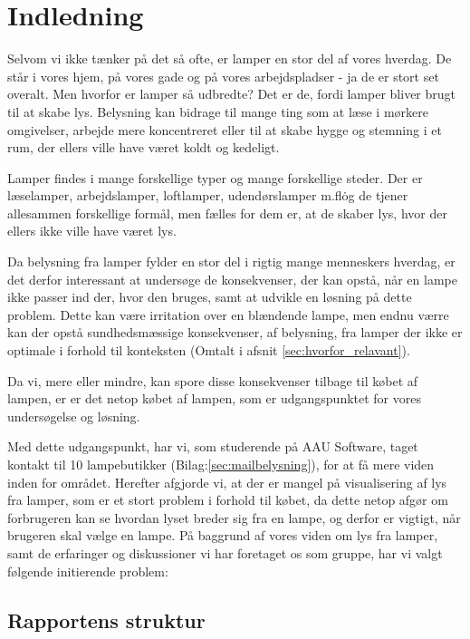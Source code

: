 \section{Indledning}
Selvom vi ikke tænker på det så ofte, er lamper en stor del af vores hverdag. De står i vores hjem, på vores gade og på vores arbejdspladser - ja de er stort set overalt. Men hvorfor er lamper så udbredte? Det er de, fordi lamper bliver brugt til at skabe lys. Belysning kan bidrage til mange ting som at læse i mørkere omgivelser, arbejde mere koncentreret eller til at skabe hygge og stemning i et rum, der ellers ville have været koldt og kedeligt. 

Lamper findes i mange forskellige typer og mange forskellige steder. Der er læselamper, arbejdslamper, loftlamper, udendørslamper m.fl\. og de tjener allesammen forskellige formål, men fælles for dem er, at de skaber lys, hvor der ellers ikke ville have været lys. 

Da belysning fra lamper fylder en stor del i rigtig mange menneskers hverdag, er det derfor interessant at undersøge de konsekvenser, der kan opstå, når en lampe ikke passer ind der, hvor den bruges, samt at udvikle en løsning på dette problem. Dette kan være irritation over en blændende lampe, men endnu værre kan der opstå sundhedsmæssige konsekvenser, af belysning, fra lamper der ikke er optimale i forhold til konteksten (Omtalt i afsnit \ref{sec:hvorfor_relavant}).

Da vi, mere eller mindre, kan spore disse konsekvenser tilbage til købet af lampen, er er det netop købet af lampen, som er udgangspunktet for vores undersøgelse og løsning.

Med dette udgangspunkt, har vi, som studerende på AAU Software, taget kontakt til 10 lampebutikker (Bilag:\ref{sec:mailbelysning}), for at få mere viden inden for området. Herefter afgjorde vi, at der er mangel på visualisering af lys fra lamper, som er et stort problem i forhold til købet, da dette netop afgør om forbrugeren kan se hvordan lyset breder sig fra en lampe, og derfor er vigtigt, når brugeren skal vælge en lampe. På baggrund af vores viden om lys fra lamper, samt de erfaringer og diskussioner vi har foretaget os som gruppe, har vi valgt følgende initierende problem:



\subsection{Rapportens struktur}

